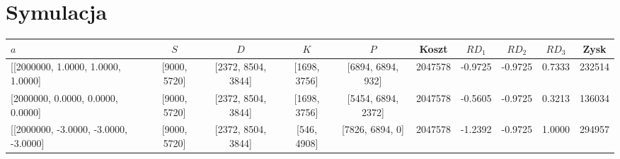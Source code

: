 \documentclass[a4paper,10pt,fleqn]{article}
\begin{document}
	\section{Symulacja}
		\begin{landscape}
			\begin{center}
			    \begin{tabular}{ | l | c | c | c | c | c | c | c | c |c |}
			    \hline
				
			    $a$ & $S$ & $D$ & $K$ & $P$ & Koszt & $RD_{1}$  & $RD_{2}$ & $RD_{3}$ & Zysk \\ \hline

			    	[[2000000, 1.0000, 1.0000, 1.0000] &  [9000, 5720] & [2372, 8504, 3844] & [1698, 3756] & [6894, 6894, 932] & 2047578 & -0.9725  & -0.9725  & 0.7333  & 232514  \\ \hline

			    	[2000000, 0.0000, 0.0000, 0.0000] &  [9000, 5720] & [2372, 8504, 3844] & [1698, 3756] & [5454, 6894, 2372] & 2047578 & -0.5605  & -0.9725  & 0.3213  & 136034 \\ \hline

				[[2000000, -3.0000, -3.0000, -3.0000] &  [9000, 5720] & [2372, 8504, 3844] & [546, 4908] & [7826, 6894, 0] & 2047578 & -1.2392  & -0.9725  & 1.0000  & 294957  \\  \hline
				

\end{tabular}
\end{center}
\end{landscape}
\end{document}
